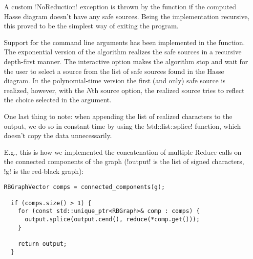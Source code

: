 A custom !NoReduction! exception is thrown by the function if the computed Hasse diagram doesn't have any safe sources.
Being the implementation recursive, this proved to be the simplest way of exiting the program.

Support for the command line arguments has been implemented in the function.
The exponential version of the algorithm realizes the safe sources in a recursive depth-first manner.
The interactive option makes the algorithm stop and wait for the user to select a source from the list of safe sources found in the Hasse diagram.
In the polynomial-time version the first (and only) safe source is realized, however, with the $N$th source option, the realized source tries to reflect the choice selected in the argument.

One last thing to note: when appending the list of realized characters to the output, we do so in constant time by using the !std::list::splice! function, which doesn't copy the data unnecessarily.

E.g., this is how we implemented the concatenation of multiple Reduce calls on the connected components of the graph (!output! is the list of signed characters, !g! is the red-black graph):

\begin{lstlisting}[moreemph={RBGraphVector, RBGraph}]
  RBGraphVector comps = connected_components(g);

  if (comps.size() > 1) {
    for (const std::unique_ptr<RBGraph>& comp : comps) {
      output.splice(output.cend(), reduce(*comp.get()));
    }

    return output;
  }
\end{lstlisting}
